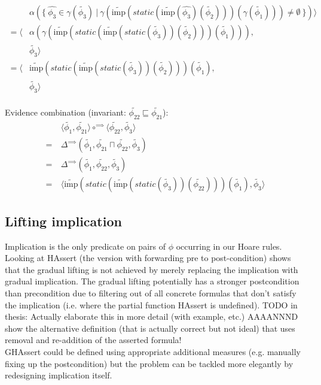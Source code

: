 \documentclass[11pt,a4paper]{article}
\newcommand{\grad}[1]{\widetilde{#1}}
\newcommand{\imp}{\textrm{imp}}
\begin{document}
\begin{align*}
&\alpha(\{~ \hat{\phi_3} \in \gamma(\grad{\phi_3}) ~|~ \gamma(\grad{\imp}(static(\grad{\imp}(\hat{\phi_3})(\grad{\phi_2})))(\gamma(\grad{\phi_1}))) \neq \emptyset  ~\})
\rangle\\
= \langle 
&\alpha(\gamma(\grad{\imp}(static(\grad{\imp}(static(\grad{\phi_3}))(\grad{\phi_2})))(\grad{\phi_1}))), \\
&\grad{\phi_3}
\rangle\\
= \langle 
&\grad{\imp}(static(\grad{\imp}(static(\grad{\phi_3}))(\grad{\phi_2})))(\grad{\phi_1}), \\
&\grad{\phi_3}
\rangle\\
\end{align*}
         
Evidence combination (invariant: $\grad{\phi_{22}} \sqsubseteq \grad{\phi_{21}}$):
\begin{align*}
   &\langle \grad{\phi_1}, \grad{\phi_{21}} \rangle \circ^{\implies} \langle \grad{\phi_{22}}, \grad{\phi_3} \rangle \\
=~ &\Delta^{\implies}(\grad{\phi_1}, \grad{\phi_{21}} \sqcap \grad{\phi_{22}}, \grad{\phi_3}) \\
=~ &\Delta^{\implies}(\grad{\phi_1}, \grad{\phi_{22}}, \grad{\phi_3}) \\
=~ &
\langle 
\grad{\imp}(static(\grad{\imp}(static(\grad{\phi_3}))(\grad{\phi_{22}})))(\grad{\phi_1}),
\grad{\phi_3}
\rangle
\end{align*}
         
\subsection{Lifting implication}
Implication is the only predicate on pairs of $\phi$ occurring in our Hoare rules.\\

Looking at HAssert (the version with forwarding pre to post-condition) shows that the gradual lifting is not achieved by merely replacing the implication with gradual implication.
The gradual lifting potentially has a stronger postcondition than precondition due to filtering out of all concrete formulas that don't satisfy the implication (i.e. where the partial function HAssert is undefined).
TODO in thesis: Actually elaborate this in more detail (with example, etc.) AAAANNND show the alternative definition (that is actually correct but not ideal) that uses removal and re-addition of the asserted formula!\\

GHAssert could be defined using appropriate additional measures (e.g. manually fixing up the postcondition) but the problem can be tackled more elegantly by redesigning implication itself.\\
\end{document}
